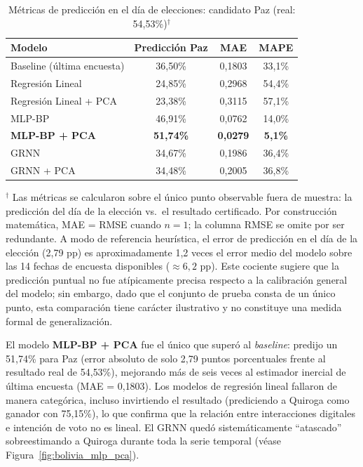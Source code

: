 \begin{table}[htbp]
\centering
\caption{Métricas de predicción en el día de elecciones: candidato Paz (real: 54{,}53\%)$^\dagger$}
\label{tab:bolivia_metricas}
\begin{tabular}{l c c c}
\toprule
\textbf{Modelo} & \textbf{Predicción Paz} & \textbf{MAE} & \textbf{MAPE} \\
\midrule
Baseline (última encuesta)    & 36{,}50\% & 0{,}1803 & 33{,}1\% \\
Regresión Lineal              & 24{,}85\% & 0{,}2968 & 54{,}4\% \\
Regresión Lineal + PCA        & 23{,}38\% & 0{,}3115 & 57{,}1\% \\
MLP-BP                        & 46{,}91\% & 0{,}0762 & 14{,}0\% \\
\textbf{MLP-BP + PCA}         & \textbf{51{,}74\%} & \textbf{0{,}0279} & \textbf{5{,}1\%} \\
GRNN                          & 34{,}67\% & 0{,}1986 & 36{,}4\% \\
GRNN + PCA                    & 34{,}48\% & 0{,}2005 & 36{,}8\% \\
\bottomrule
\end{tabular}
\vspace{0.5em}
\begin{minipage}{0.92\textwidth}
\footnotesize $^\dagger$ Las métricas se calcularon sobre el único punto observable fuera de muestra: la predicción del día de la elección vs.~el resultado certificado. Por construcción matemática, MAE = RMSE cuando $n=1$; la columna RMSE se omite por ser redundante. A modo de referencia heurística, el error de predicción en el día de la elección (2{,}79 pp) es aproximadamente 1{,}2 veces el error medio del modelo sobre las 14 fechas de encuesta disponibles ($\approx 6{,}2$ pp). Este cociente sugiere que la predicción puntual no fue atípicamente precisa respecto a la calibración general del modelo; sin embargo, dado que el conjunto de prueba consta de un único punto, esta comparación tiene carácter ilustrativo y no constituye una medida formal de generalización.
\end{minipage}
\end{table}

El modelo \textbf{MLP-BP + PCA} fue el único que superó al \textit{baseline}: predijo un 51{,}74\% para Paz (error absoluto de solo 2{,}79 puntos porcentuales frente al resultado real de 54{,}53\%), mejorando más de seis veces al estimador inercial de última encuesta (MAE = 0{,}1803). Los modelos de regresión lineal fallaron de manera categórica, incluso invirtiendo el resultado (prediciendo a Quiroga como ganador con 75{,}15\%), lo que confirma que la relación entre interacciones digitales e intención de voto no es lineal. El GRNN quedó sistemáticamente ``atascado'' sobreestimando a Quiroga durante toda la serie temporal (véase Figura~\ref{fig:bolivia_mlp_pca}).


